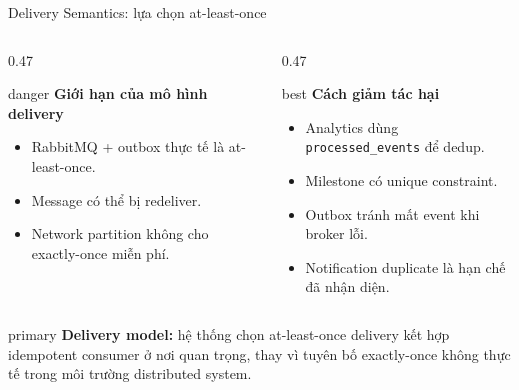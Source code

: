 \documentclass[aspectratio=169]{beamer}
\begin{document}
\begin{frame}{Delivery Semantics: lựa chọn at-least-once}
    \begin{columns}[T,onlytextwidth]
        \begin{column}{0.47\textwidth}
            \begin{claimbox}{danger}
                \textbf{Giới hạn của mô hình delivery}
                \begin{itemize}\small
                    \item RabbitMQ + outbox thực tế là at-least-once.
                    \item Message có thể bị redeliver.
                    \item Network partition không cho exactly-once miễn phí.
                \end{itemize}
            \end{claimbox}
        \end{column}
        \begin{column}{0.47\textwidth}
            \begin{claimbox}{best}
                \textbf{Cách giảm tác hại}
                \begin{itemize}\small
                    \item Analytics dùng \texttt{processed\_events} để dedup.
                    \item Milestone có unique constraint.
                    \item Outbox tránh mất event khi broker lỗi.
                    \item Notification duplicate là hạn chế đã nhận diện.
                \end{itemize}
            \end{claimbox}
        \end{column}
    \end{columns}
    \vspace{0.35cm}
    \begin{claimbox}{primary}
        \small \textbf{Delivery model:} hệ thống chọn at-least-once delivery kết hợp idempotent consumer ở nơi quan trọng, thay vì tuyên bố exactly-once không thực tế trong môi trường distributed system.
    \end{claimbox}
\end{frame}
\end{document}
